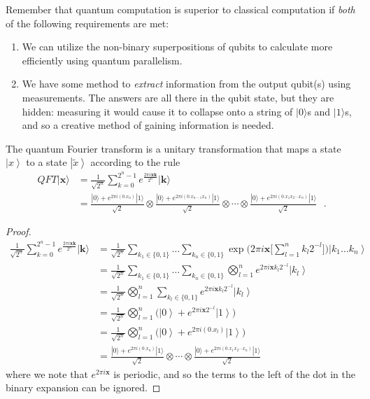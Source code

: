 \documentclass{article}
\newcommand{\ket}[1]{\ensuremath{\left|#1\right\rangle}}
\newcounter{theorem}[section]
\begin{document}
    Remember that quantum computation is superior to classical computation if \textit{both} of the following requirements are met: 
    \begin{enumerate}
      \item We can utilize the non-binary superpositions of qubits to calculate more efficiently using quantum parallelism. 
      \item We have some method to \textit{extract} information from the output qubit(s) using measurements. The answers are all there in the qubit state, but they are hidden: measuring it would cause it to collapse onto a string of $|0\rangle$s and $|1\rangle$s, and so a creative method of gaining information is needed. 
    \end{enumerate}

    \begin{theorem}
      \label{thm:quantum-fourier-transform}
      The quantum Fourier transform is a unitary transformation that maps a state $\ket{x}$ to a state $\ket{\tilde{x}}$ according to the rule 
      \begin{align}
      QFT|\mathbf{x}\rangle &= 
      \frac{1}{\sqrt{2^n}} \sum_{k = 0}^{2^n-1} e^{\frac{2 \pi i \mathbf{x} \mathbf{k} }{2^n}} |\mathbf{k}\rangle \\ & = \frac{|0 \rangle + e^{2\pi i (0.x_n)}|1\rangle}{\sqrt{2}} \otimes \frac{|0\rangle + e^{2 \pi i (0.x_{n-1}x_n)}|1\rangle}{\sqrt{2}} \otimes \cdots \otimes \frac{|0\rangle + e^{2 \pi i (0.x_1 x_2\cdots x_n)}|1\rangle}{\sqrt{2}} \ \ \ .
      \end{align}
    \end{theorem}
    \begin{proof} 
      \begin{align} 
        \frac{1}{\sqrt{2^n}} \sum_{k = 0}^{2^n-1} e^{\frac{2 \pi i \mathbf{x} \mathbf{k} }{2^n}} |\mathbf{k}\rangle 
        & = \frac{1}{\sqrt{2^n}} \sum_{k_1 \in \{0, 1\}} \ldots \sum_{k_n \in \{0, 1\}} \exp \bigg( 2 \pi i \mathbf{x} \Big[ \sum_{l=1}^n k_l 2^{-l} \Big]\bigg) \ket{k_1 \ldots k_n} \\
        & = \frac{1}{\sqrt{2^n}} \sum_{k_1 \in \{0, 1\}} \ldots \sum_{k_n \in \{0, 1\}} \bigotimes_{l=1}^n e^{2 \pi i \mathbf{x} k_l 2^{-l}} \ket{k_l} \\
        & = \frac{1}{\sqrt{2^n}} \bigotimes_{l=1}^n \sum_{k_l \in \{0, 1\}} e^{2 \pi i \mathbf{x} k_l 2^{-l}} \ket{k_l} \\
        & = \frac{1}{\sqrt{2^n}} \bigotimes_{l=1}^n \bigg( \ket{0} + e^{2 \pi i \mathbf{x} 2^{-l}} \ket{1} \bigg) \\ 
        & = \frac{1}{\sqrt{2^n}} \bigotimes_{l=1}^n \bigg( \ket{0} + e^{2 \pi i (0.x_l)} \ket{1} \bigg) \\ 
        & = \frac{|0 \rangle + e^{2\pi i (0.x_n)}|1\rangle}{\sqrt{2}} \otimes \cdots \otimes \frac{|0\rangle + e^{2 \pi i (0.x_1 x_2\cdots x_n)}|1\rangle}{\sqrt{2}} 
      \end{align}
      where we note that $e^{2 \pi i \mathbf{x}}$ is periodic, and so the terms to the left of the dot in the binary expansion can be ignored. 
    \end{proof}
\end{document}
